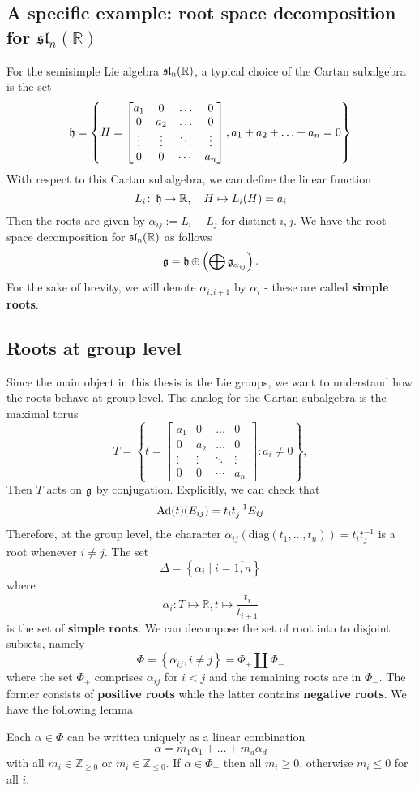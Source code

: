 \subsection{A specific example: root space decomposition for $\mathfrak{sl}_n(\mathbb{R})$}
For the semisimple Lie algebra $\operatorname{\mathfrak{sl}_n(\mathbb{R})}$, a typical choice of the Cartan subalgebra is the set
\[\operatorname{\mathfrak{h}} = \left\lbrace H= \begin{bmatrix}
        a_1    & 0      & \ldots & 0      \\
        0      & a_2    & \ldots & 0      \\
        \vdots & \vdots & \ddots & \vdots \\
        0      & 0      & \cdots & a_n
    \end{bmatrix}, a_1 + a_2+ \ldots + a_n = 0\right\rbrace\]
With respect to this Cartan subalgebra, we can define the linear function
\[L_i \colon \operatorname{\mathfrak{h}} \to \mathbb{R}, \quad H \mapsto L_i(H)= a_i\]
Then the roots are given by $\alpha_{ij} :=L_i - L_j$ for distinct $i,j$. We have the root space decomposition for $\operatorname{\mathfrak{sl}_n(\mathbb{R})}$ as follows
\[\operatorname{\mathfrak{g}} = \operatorname{\mathfrak{h}} \oplus \left(\bigoplus\operatorname{\mathfrak{g}}_{\alpha_{ij}}\right).\]
For the sake of brevity, we will denote $\alpha_{i,i+1}$ by $\alpha_i$ - these are called \textbf{simple roots}.
\subsection{Roots at group level}
Since the main object in this thesis is the Lie groups, we want to understand how the roots
behave at group level. The analog for the Cartan subalgebra is the maximal torus
\[T = \left\lbrace t= \begin{bmatrix}
        a_1    & 0      & \ldots & 0      \\
        0      & a_2    & \ldots & 0      \\
        \vdots & \vdots & \ddots & \vdots \\
        0      & 0      & \cdots & a_n
    \end{bmatrix} :  a_i \ne 0\right\rbrace,\]
Then $T$ acts on $\operatorname{\mathfrak{g}}$ by conjugation. Explicitly, we can check that
\[\operatorname{\text{Ad}}(t)(E_{ij}) = t_it_j^{-1}E_{ij}\]
Therefore, at the group level, the character $\alpha_{ij}(\text{diag}(t_1,\ldots,t_n))=t_it_j^{-1}$
is a root whenever $i \ne j$. The set
\[\Delta = \left\lbrace \alpha_i\mid i =\overline{1,n}\right\rbrace\]
where
\[\alpha_i \colon T \mapsto \mathbb{R}, t \mapsto \dfrac{t_i}{t_{i+1}}\]
is the set of \textbf{simple roots}.
We can decompose the set of root into to disjoint subsets, namely
\[\Phi = \left\lbrace \alpha_{ij}, i \ne j\right\rbrace = \Phi_+ \coprod \Phi_{-}\]
where the set $\Phi_+$ comprises $\alpha_{ij}$ for $i<j$ and the remaining roots are in $\Phi_{-}$. The former consists of
\textbf{positive roots} while the latter contains \textbf{negative roots}. We have the following lemma
\begin{lemma}\label{linear-comb-of-roots}
    Each $\alpha \in \Phi$ can be written uniquely as a linear combination
    \[\alpha = m_1\alpha_1+\ldots+m_{d}\alpha_{d}\]
    with all $m_i \in \mathbb{Z}_{\ge 0}$ or $m_i \in \mathbb{Z}_{\le 0}$. If $\alpha \in \Phi_+$ then all $m_i \ge 0$, otherwise $m_i \le 0$ for all $i$.
\end{lemma}
